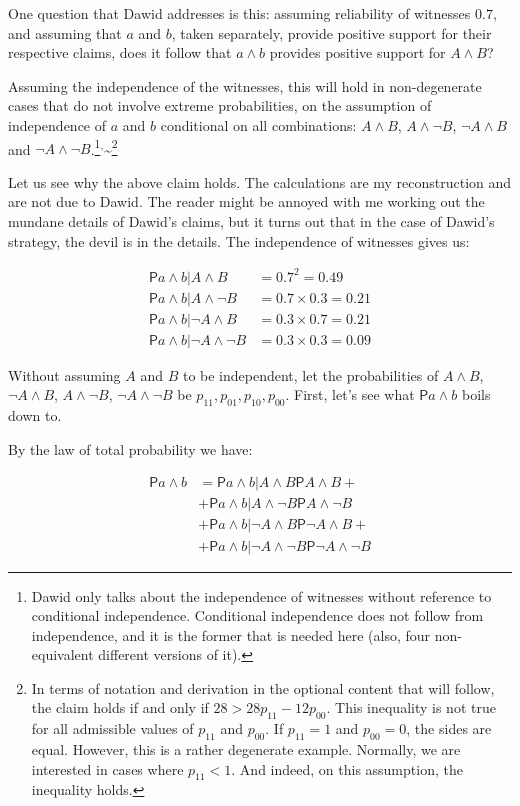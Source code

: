 \documentclass[10pt,dvipsnames,enabledeprecatedfontcommands]{scrartcl}
\newcommand{\n}{\neg}
\newcommand{\et}{\wedge}
\newcommand{\pr}{\mathsf{P}}
\begin{document}
One question that Dawid addresses is this: assuming reliability of
witnesses \(0.7\), and assuming that \(a\) and \(b\), taken separately,
provide positive support for their respective claims, does it follow
that \(a \et b\) provides positive support for \(A\et B\)?

Assuming the independence of the witnesses, this will hold in
non-degenerate cases that do not involve extreme probabilities, on the
assumption of independence of \(a\) and \(b\) conditional on all
combinations: \(A\et B\), \(A\et \n B\), \(\n A \et B\) and
\(\n A \et \n B\).\footnote{Dawid only talks about the independence of witnesses without reference to  conditional independence. Conditional independence does not follow from independence, and it is the former that is needed here (also, four non-equivalent different versions of it).}\(^,\)\textasciitilde{}\footnote{In terms of notation and derivation in the optional content that will follow, the claim holds  if and only if $28 > 28 p_{11}-12p_{00}$.  This inequality is not  true for all admissible values of $p_{11}$ and $p_{00}$. If $p_{11}=1$ and $p_{00}=0$, the sides are equal. However, this is a rather degenerate example. Normally, we are  interested in cases where $p_{11}< 1$. And indeed, on this assumption, the inequality holds.}

Let us see why the above claim holds. The calculations are my
reconstruction and are not due to Dawid. The reader might be annoyed
with me working out the mundane details of Dawid's claims, but it turns
out that in the case of Dawid's strategy, the devil is in the details.
The independence of witnesses gives us:

\begin{align*}
 \pr{a \et b \vert A\et B}& =0.7^2=0.49\\
 \pr{a \et b \vert A\et \n B}& =  0.7\times 0.3=0.21\\
 \pr{a \et b \vert \n A\et B}& =  0.3\times 0.7=0.21\\
 \pr{a \et b \vert \n A\et \n B}& =  0.3\times 0.3=0.09
 \end{align*}

Without assuming \(A\) and \(B\) to be independent, let the
probabilities of \(A\et B\), \(\n A\et B\), \(A\et \n B\),
\(\n A\et \n B\) be \(p_{11}, p_{01}, p_{10}, p_{00}\). First, let's see
what \(\pr{a\et b}\) boils down to.

By the law of total probability we have:

\begin{align}\label{eq:total_lower}
 \pr{a\et b} & = 
                     \pr{a\et b \vert A \et B}\pr{A\et B} + \\ &  \nonumber
                     +\pr{a\et b \vert A \et \n B}\pr{A\et \n B} \\ &  \nonumber
 + \pr{a\et b \vert \n A \et B}\pr{\n A\et B} + \\ & \nonumber
                     + \pr{a\et b \vert \n A \et \n B}\pr{\n A\et \n B}
 \end{align}
\end{document}
